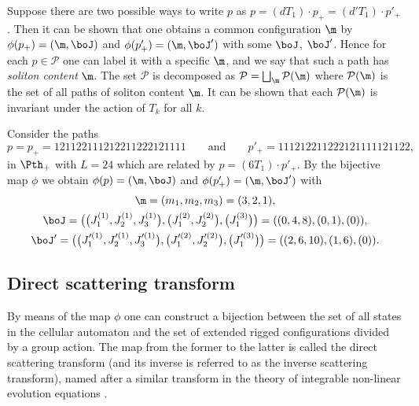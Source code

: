 Suppose there are two possible ways to write $p$ as $p =(d T_1) \cdot p_+ = (d' T_1) \cdot p'_+$.
Then it can be shown that
one obtains a common conf\/iguration $\m$ by $\phi (p_+) = (\m,\boJ)$ and $\phi (p'_+) = (\m,\boJ')$ with some $\boJ$, $\boJ'$.
Hence for each $p \in {\mathcal P}$ one can label it with a specif\/ic $\m$, and we say that such a path has {\em soliton content} $\m$.
The set ${\mathcal P}$ is decomposed as ${\mathcal P} = \bigsqcup_{\m} {\mathcal P}(\m)$
where ${\mathcal P}(\m)$ is the set of all paths of soliton content $\m$.
It can be shown that each ${\mathcal P}(\m)$ is
invariant under the action of $T_k$ for all $k$.

\begin{example}\label{ex:oct16_1}
Consider the paths
\begin{equation*}
p=p_+=121122111212211222121111 \qquad \mbox{and} \qquad p'_+=111212211222121111121122,
\end{equation*}
in $\Pth_+$ with $L=24$ which are related by
$p = (6 T_1) \cdot p'_+$.
By the bijective map $\phi$
we obtain
$\phi (p) = (\m, \boJ)$ and $\phi (p'_+) = (\m, \boJ')$
with
\begin{gather*}
\m  = (m_1, m_2, m_3) = (3,2,1),\\
\boJ  = \big(\big(J^{(1)}_1,J^{(1)}_2,J^{(1)}_3\big),\big(J^{(2)}_1,J^{(2)}_2\big),\big(J^{(3)}_1\big)\big) = ((0,4,8),(0,1),(0)),\\
\boJ'  = \big(\big(J'^{(1)}_1,J'^{(1)}_2,J'^{(1)}_3\big),\big(J'^{(2)}_1,J'^{(2)}_2\big),\big(J'^{(3)}_1\big)\big) = ((2,6,10),(1,6),(0)).
\end{gather*}
\end{example}


\subsection{Direct scattering transform}\label{subsec:4_3}

By means of the map $\phi$ one can construct a bijection between the set of
all states in the cellular automaton and the set of extended rigged conf\/igurations divided by a group action.
The map from the former to the latter is called the direct scattering transform
(and its inverse is referred to as the inverse scattering transform),
named after a similar transform in the theory of integrable non-linear evolution equations \cite{AS}.


